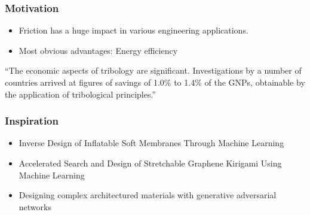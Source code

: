 \documentclass[
	10pt, %
]{beamer}
\begin{document}
\begin{frame}
	\frametitle{Motivation}
	
	\begin{itemize}
		\item Friction has a huge impact in various engineering applications.
		\item Most obvious advantages: Energy efficiency
	\end{itemize}


	\begin{exampleblock}{}
		{``The economic aspects of tribology are significant. Investigations by a number of countries arrived at figures of savings of 1.0\% to 1.4\% of the GNPs, obtainable by the application of tribological principles.''}
		\vskip5mm
		\hspace*{}
	\end{exampleblock}


	
\end{frame}




\begin{frame}
	\frametitle{Inspiration}

	\begin{itemize}
		\item Inverse Design of Inflatable Soft Membranes Through Machine Learning
		\item Accelerated Search and Design of Stretchable Graphene Kirigami Using Machine Learning
		\item Designing complex architectured materials with generative adversarial networks
	\end{itemize}


	
\end{frame}
\end{document}
